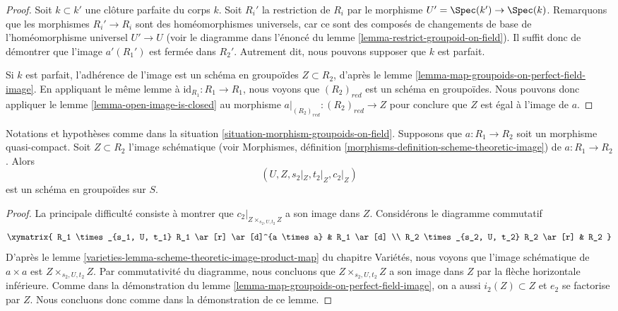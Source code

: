 \begin{proof}
Soit $k \subset k'$ une clôture parfaite du corps $k$.
Soit $R_i'$ la restriction de $R_i$ par le morphisme
$U' = \Spec(k') \to \Spec(k)$. Remarquons que les
morphismes $R_i' \to R_i$ sont des homéomorphismes universels, car ce sont des
composés de changements de base de l'homéomorphisme universel
$U' \to U$ (voir le diagramme dans l'énoncé du
lemme \ref{lemma-restrict-groupoid-on-field}).
Il suffit donc de démontrer que l'image $a'(R_1')$ est fermée
dans $R_2'$. Autrement dit, nous pouvons supposer que $k$ est parfait.

\medskip\noindent
Si $k$ est parfait, l'adhérence de l'image est
un schéma en groupoïdes $Z \subset R_2$, d'après le
lemme \ref{lemma-map-groupoids-on-perfect-field-image}.
En appliquant le même lemme à
$\text{id}_{R_1} : R_1 \to R_1$,
nous voyons que $(R_2)_{red}$ est un schéma en groupoïdes.
Nous pouvons donc appliquer le
lemme \ref{lemma-open-image-is-closed}
au morphisme
$a|_{(R_2)_{red}} : (R_2)_{red} \to Z$
pour conclure que $Z$ est égal à l'image de $a$.
\end{proof}

\begin{lemma}
\label{lemma-quasi-compact-map-groupoids-on-field-image}
Notations et hypothèses comme dans la
situation \ref{situation-morphism-groupoids-on-field}.
Supposons que $a : R_1 \to R_2$ soit un morphisme quasi-compact.
Soit $Z \subset R_2$ l'image schématique (voir
Morphismes, définition \ref{morphisms-definition-scheme-theoretic-image})
de $a : R_1 \to R_2$. Alors
$$
(U, Z, s_2|_Z, t_2|_Z, c_2|_Z)
$$
est un schéma en groupoïdes sur $S$.
\end{lemma}

\begin{proof}
La principale difficulté consiste à montrer que $c_2|_{Z \times_{s_2, U, t_2} Z}$
a son image dans $Z$. Considérons le diagramme commutatif
$$
\xymatrix{
R_1 \times_{s_1, U, t_1} R_1 \ar[r] \ar[d]^{a \times a} & R_1 \ar[d] \\
R_2 \times_{s_2, U, t_2} R_2 \ar[r] & R_2
}
$$
D'après le
lemme \ref{varieties-lemma-scheme-theoretic-image-product-map} du chapitre Variétés,
nous voyons que l'image schématique de $a \times a$ est
$Z \times_{s_2, U, t_2} Z$. Par commutativité du diagramme, nous
concluons que $Z \times_{s_2, U, t_2} Z$ a son image dans $Z$ par la flèche
horizontale inférieure. Comme dans la démonstration du
lemme \ref{lemma-map-groupoids-on-perfect-field-image},
on a aussi $i_2(Z) \subset Z$ et
$e_2$ se factorise par $Z$. Nous concluons donc comme dans la
démonstration de ce lemme.
\end{proof}

